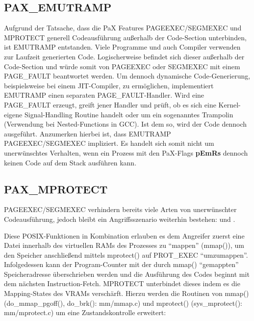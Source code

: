 \subsection{PAX\_EMUTRAMP}
\label{subsec:PAX_EMUTRAMP}
Aufgrund der Tatsache, dass die PaX Features PAGEEXEC/SEGMEXEC und MPROTECT generell Codeausführung außerhalb der Code-Section unterbinden, ist EMUTRAMP entstanden. Viele Programme und auch Compiler verwenden zur Laufzeit generierten Code. Logischerweise befindet sich dieser außerhalb der Code-Section und würde somit von PAGEEXEC oder SEGMEXEC mit einem PAGE\_FAULT beantwortet werden. Um dennoch dynamische Code-Generierung, beispielsweise bei einem JIT-Compiler, zu ermöglichen, implementiert EMUTRAMP einen separaten PAGE\_FAULT-Handler. Wird eine PAGE\_FAULT erzeugt, greift jener Handler und prüft, ob es sich eine Kernel-eigene Signal-Handling Routine handelt oder um ein sogenanntes Trampolin (Verwendung bei Nested-Functions in GCC). Ist dem so, wird der Code dennoch ausgeführt.
Anzumerken hierbei ist, dass EMUTRAMP PAGEEXEC/SEGMEXEC impliziert. Es handelt sich somit nicht um unerwünschtes Verhalten, wenn ein Prozess mit den PaX-Flags \textbf{pEmRs} dennoch keinen Code auf dem Stack ausführen kann.

\subsection{PAX\_MPROTECT}
\label{subsec:PAX_MPROTECT}
PAGEEXEC/SEGMEXEC verhindern bereits viele Arten von unerwünschter Codeausführung, jedoch bleibt ein Angriffsszenario weiterhin bestehen:  und .

Diese POSIX-Funktionen in Kombination erlauben es dem Angreifer zuerst eine Datei innerhalb des virtuellen RAMs des Prozesses zu "`mappen"' (mmap()), um den Speicher anschließend mittels mprotect() auf PROT\_EXEC "`umzumappen"'. Infolgedessen kann der Program-Counter mit der durch mmap() "`gemappten"' Speicheradresse überschrieben werden und die Ausführung des Codes beginnt mit dem nächsten Instruction-Fetch.
MPROTECT unterbindet dieses indem es die Mapping-States des VRAMs verschärft. Hierzu werden die Routinen von mmap() (do\_mmap\_pgoff(), do\_brk(): mm/mmap.c) und mprotect() (sys\_mprotect(): mm/mprotect.c) um eine Zustandskontrolle erweitert:

